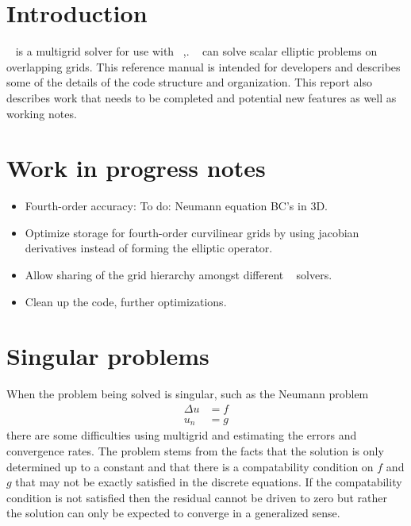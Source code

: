 \documentclass[12pt]{article}
\begin{document}
\vfill\eject
\tableofcontents



\vfill\eject
\section{Introduction}

\Ogmg~ is a multigrid solver for use with \Overture~\cite{overset96},\cite{OGES}.
\Ogmg~ can solve scalar elliptic problems
on overlapping grids. This reference manual is intended for developers and describes
some of the details of the code structure and organization.
This report also describes work that needs to be completed and potential new features
as well as working notes.


\section{Work in progress notes}

\begin{itemize}
  \item Fourth-order accuracy: To do: Neumann equation BC's in 3D.
  \item Optimize storage for fourth-order curvilinear grids by using jacobian derivatives
        instead of forming the elliptic operator.
  \item Allow sharing of the grid hierarchy amongst different \Ogmg~ solvers.
  \item Clean up the code, further optimizations.
\end{itemize}





\clearpage
\section{Singular problems}

When the problem being solved is singular, such as the Neumann problem
\begin{align*}
   \Delta u & = f \\
   u_n & =g
\end{align*}
there are some difficulties using multigrid and estimating the errors and
convergence rates. The problem stems from the facts that the solution is
only determined up to a constant and that there is a compatability condition
on $f$ and $g$ that may not be exactly satisfied in the discrete equations. 
If the compatability condition is not satisfied then the residual cannot 
be driven to zero but rather the solution can only be expected to converge
in a generalized sense. 
\end{document}
